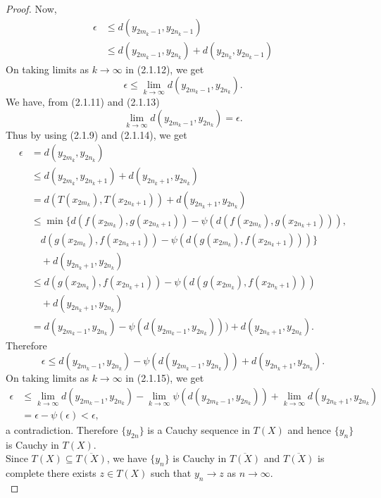\documentclass[10pt,a4paper]{amsart}
\begin{document}
\begin{proof}
Now,
\begin{align}
\epsilon &\leq d(y_{2m_{k}-1},y_{2n_{k}-1}) \nonumber\\
&\leq d(y_{2m_{k}-1},y_{2n_{k}})+d(y_{2n_{k}},y_{2n_{k}-1})
\end{align}
On taking limits as $k\to\infty$ in (2.1.12), we get
\begin{equation}
\epsilon\leq\lim_{k\to\infty}d(y_{2m_{k}-1},y_{2n_{k}}).
\end{equation}
We have, from (2.1.11) and (2.1.13)
\begin{equation}
\lim_{k\to\infty}d(y_{2m_{k}-1},y_{2n_{k}})=\epsilon.
\end{equation}
Thus by using (2.1.9) and (2.1.14), we get
\begin{align*}
\epsilon &= d(y_{2m_{k}},y_{2n_{k}}) \\
&\leq d(y_{2m_{k}},y_{2n_{k}+1})+d(y_{2n_{k}+1},y_{2n_{k}}) \\
&= d(T(x_{2m_{k}}),T(x_{2n_{k}+1}))+d(y_{2n_{k}+1},y_{2n_{k}}) \\
&\leq \min\{d(f(x_{2m_{k}}),g(x_{2n_{k}+1}))-\psi(d(f(x_{2m_{k}}),g(x_{2n_{k}+1}))), \\
&\quad d(g(x_{2m_{k}}),f(x_{2n_{k}+1}))-\psi(d(g(x_{2m_{k}}),f(x_{2n_{k}+1})))\} \\
&\quad +d(y_{2n_{k}+1},y_{2n_{k}}) \\
&\leq d(g(x_{2m_{k}}),f(x_{2n_{k}+1}))-\psi(d(g(x_{2m_{k}}),f(x_{2n_{k}+1}))) \\
&\quad +d(y_{2n_{k}+1},y_{2n_{k}}) \\
&= d(y_{2m_{k}-1},y_{2n_{k}})-\psi(d(y_{2m_{k}-1},y_{2n_{k}})))+d(y_{2n_{k}+1},y_{2n_{k}}).
\end{align*}
Therefore
\begin{equation}
\epsilon \leq d(y_{2m_{k}-1},y_{2n_{k}})-\psi(d(y_{2m_{k}-1},y_{2n_{k}}))+d(y_{2n_{k}+1},y_{2n_{k}}).
\end{equation}
On taking limits as $k\to\infty$ in (2.1.15), we get
\begin{align*}
\epsilon &\leq \lim_{k\to\infty}d(y_{2m_{k}-1},y_{2n_{k}})-\lim_{k\to\infty}\psi(d(y_{2m_{k}-1},y_{2n_{k}}))+\lim_{k\to\infty}d(y_{2n_{k}+1},y_{2n_{k}}) \\
&= \epsilon-\psi(\epsilon)<\epsilon,
\end{align*}
a contradiction.
Therefore $\{y_{2n}\}$ is a Cauchy sequence in $T(X)$ and hence $\{y_{n}\}$ is Cauchy in $T(X)$.\\
Since $T(X)\subseteq\overline{T(X)}$, we have $\{y_{n}\}$ is Cauchy in $\overline{T(X)}$ and $\overline{T(X)}$ is complete there exists $z\in T(X)$ such that $y_{n}\to z$ as $n\to\infty$.\\

\end{proof}
\end{document}
